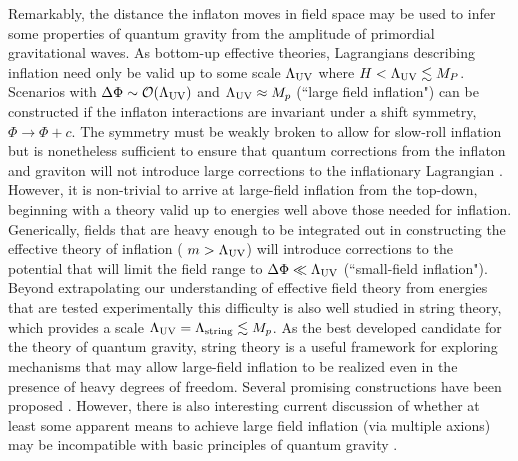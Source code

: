 Remarkably, the distance the inflaton moves in field space may be used to infer some properties of quantum gravity from the amplitude of primordial gravitational waves. As bottom-up effective theories, Lagrangians describing inflation need only be valid up to some scale $\Lambda_{\rm UV}$ where $H<\Lambda_{\rm UV}\lesssim M_P$. Scenarios with $\Delta\Phi\sim\mathcal{O}(\Lambda_{\rm UV})$ and $\Lambda_{\rm UV}\approx M_p$ (``large field inflation") can be constructed if the inflaton interactions are invariant under a shift symmetry, $\Phi\rightarrow\Phi+c$. The symmetry must be weakly broken to allow for slow-roll inflation but is nonetheless sufficient to ensure that quantum corrections from the inflaton and graviton will not introduce large corrections to the inflationary Lagrangian \cite{Linde:2005ht, Kaloper:2011jz, Csaki:2014bua,Kaplan:2015fuy,Choi:2015fiu}. However, it is non-trivial to arrive at large-field inflation from the top-down, beginning with a theory valid up to energies well above those needed for inflation. Generically, fields that are heavy enough to be integrated out in constructing the effective theory of inflation ( $m>\Lambda_{\rm UV}$) will introduce corrections to the potential that will limit the field range to $\Delta\Phi\ll\Lambda_{\rm UV}$ (``small-field inflation"). Beyond extrapolating our understanding of effective field theory from energies that are tested experimentally this difficulty is also well studied in string theory, which provides a scale $\Lambda_{\rm UV}=\Lambda_{\rm string}\lesssim M_p$. As the best developed candidate for the theory of quantum gravity, string theory is a useful framework for exploring mechanisms that may allow large-field inflation to be realized even in the presence of heavy degrees of freedom. Several promising constructions have been proposed \cite{Silverstein:2008sg, McAllister:2008hb, Berg:2009tg, Palti:2014kza,McAllister:2014mpa, Marchesano:2014mla, Blumenhagen:2015xpa}. However, there is also interesting current discussion of whether at least some apparent means to achieve large field inflation (via multiple axions) may be incompatible with basic principles of quantum gravity \cite{delaFuente:2014aca,Bachlechner:2015qja,Heidenreich:2015wga,Kooner:2015rza}. 

